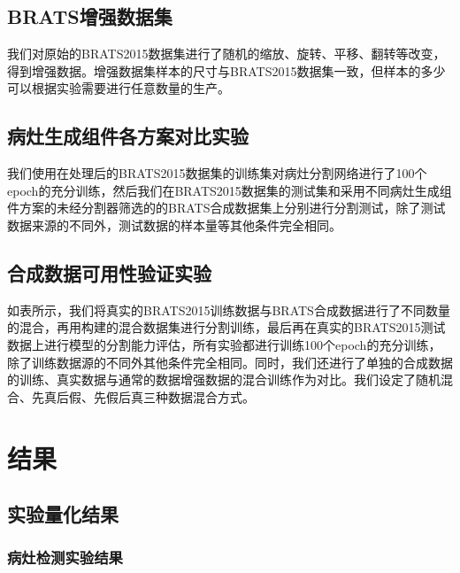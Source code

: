 \documentclass[letterpaper]{article} %
\begin{document}
\subsection{BRATS增强数据集}
我们对原始的BRATS2015数据集进行了随机的缩放、旋转、平移、翻转等改变，得到增强数据。增强数据集样本的尺寸与BRATS2015数据集一致，但样本的多少可以根据实验需要进行任意数量的生产。

\subsection{病灶生成组件各方案对比实验}
我们使用在处理后的BRATS2015数据集的训练集对病灶分割网络进行了100个epoch的充分训练，然后我们在BRATS2015数据集的测试集和采用不同病灶生成组件方案的未经分割器筛选的的BRATS合成数据集上分别进行分割测试，除了测试数据来源的不同外，测试数据的样本量等其他条件完全相同。

\subsection{合成数据可用性验证实验}
如表所示，我们将真实的BRATS2015训练数据与BRATS合成数据进行了不同数量的混合，再用构建的混合数据集进行分割训练，最后再在真实的BRATS2015测试数据上进行模型的分割能力评估，所有实验都进行训练100个epoch的充分训练，除了训练数据源的不同外其他条件完全相同。同时，我们还进行了单独的合成数据的训练、真实数据与通常的数据增强数据的混合训练作为对比。我们设定了随机混合、先真后假、先假后真三种数据混合方式。

\section{结果}
\subsection{实验量化结果}

\subsubsection{病灶检测实验结果}
\begin{table}[t]
	\caption{病灶检测实验结果.}\smallskip
	\centering
	\label{label_test}	
\end{table}
\end{document}

